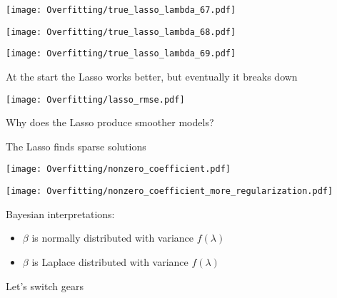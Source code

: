 \documentclass[xcolor=pdftex,dvipsnames,table]{beamer}
\begin{document}
\frame
{
	\begin{center}
		\texttt{[image: Overfitting/true\_lasso\_lambda\_67.pdf]}
	\end{center}
}

\frame
{
	\begin{center}
		\texttt{[image: Overfitting/true\_lasso\_lambda\_68.pdf]}
	\end{center}
}

\frame
{
	\begin{center}
		\texttt{[image: Overfitting/true\_lasso\_lambda\_69.pdf]}
	\end{center}
}

\frame
{
	At the start the Lasso works better, but eventually it breaks down
}

\frame
{
	\begin{center}
		\texttt{[image: Overfitting/lasso\_rmse.pdf]}
	\end{center}
}

\frame
{
	Why does the Lasso produce smoother models?
}

\frame
{
	The Lasso finds sparse solutions
}



\frame
{
	\begin{center}
		\texttt{[image: Overfitting/nonzero\_coefficient.pdf]}
	\end{center}
}

\frame
{
	\begin{center}
		\texttt{[image: Overfitting/nonzero\_coefficient\_more\_regularization.pdf]}
	\end{center}
}

\frame
{
	Bayesian interpretations:
	\begin{itemize}
		\item{$\beta$ is normally distributed with variance $f(\lambda)$}
		\item{$\beta$ is Laplace distributed with variance $f(\lambda)$}
	\end{itemize}
}

\frame
{
	Let's switch gears
}
\end{document}

